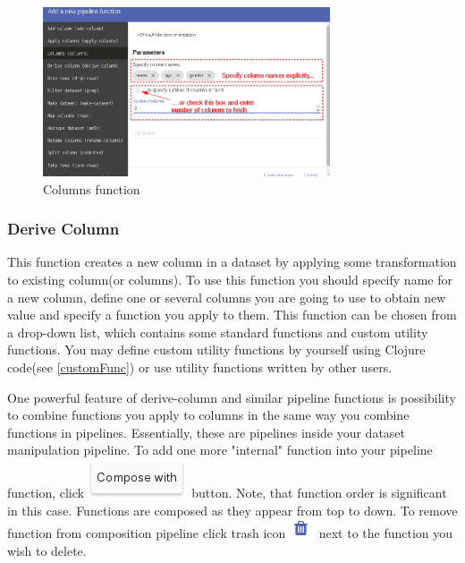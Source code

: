 \documentclass[USenglish]{article}
\begin{document}
 \begin{center}
\begin{figure}[!htbp]
\centering
\includegraphics[height=5cm] {columns.png}
 \caption{Columns function \label{meta}}
\end{figure}
\end{center}

\subsubsection{Derive Column}
This function creates a new column in a dataset by applying some transformation to existing column(or columns). To use this function you should specify name for a new column, define one or several columns you are going to use to obtain new value and specify a function you apply to them. This function can be chosen from a drop-down list, which contains some standard functions and custom utility functions. You may define custom utility functions by yourself using Clojure code(see \ref{customFunc}) or use utility functions written by other users.
\begin{mdframed}[hidealllines=true,backgroundcolor=gray!15]
One powerful feature of derive-column and similar pipeline functions is possibility to combine functions you apply to columns in the same way you combine functions in pipelines. Essentially, these are pipelines inside your dataset manipulation pipeline. To add one more "internal" function into your pipeline function, click {\includegraphics[scale=0.5]{compose.png}} button. Note, that function order is significant in this case. Functions are composed as they appear from top to down. To remove function from composition pipeline click trash icon {\includegraphics[scale=0.8]{trash.png}} next to the function you wish to delete.
\end{mdframed}
\end{document}
